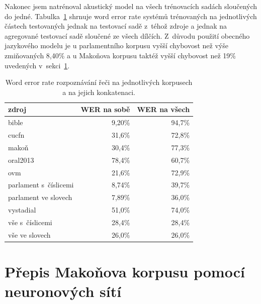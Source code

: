 Nakonec jsem natrénoval akustický model na všech trénovacích
sadách sloučených do jedné.
Tabulka~\ref{tab:csasr:results} shrnuje word error rate systémů trénovaných na
jednotlivých částech testovaných jednak na testovací sadě z~téhož zdroje a
jednak na agregované testovací sadě sloučené ze všech dílčích.
Z~důvodu použití obecného jazykového modelu je u parlamentního korpusu vyšší chybovost než
výše zmiňovaných 8,40\% a u Makoňova korpusu taktéž vyšší chybovost než 19\%
uvedených v~sekci~\ref{sec:deepspeech}.

\begin{table}[htpb]
\begin{center}
\begin{tabular}{|l||r|r|}
\hline
zdroj     & WER na sobě & WER na všech \\
\hline
bible     & 9,20\%  & 94,7\% \\
cucfn     & 31,6\%  & 72,8\% \\
makoň     & 30,4\%  & 77,3\% \\
oral2013  & 78,4\%  & 60,7\% \\
ovm       & 21,6\%  & 72,9\% \\
parlament s~číslicemi & 8,74\%  & 39,7\% \\
parlament ve slovech  & 7,89\%  & 36,0\% \\
vystadial & 51,0\%  & 74,0\% \\
\hline
vše s~číslicemi   & 28,4\%  & 28,4\% \\
vše ve slovech    & 26,0\%  & 26,0\% \\
\hline
\end{tabular}
\caption{Word error rate rozpoznávání řeči na jednotlivých korpusech a na jejich
konkatenaci.}\label{tab:csasr:results}
\end{center}
\end{table}

%

\section{Přepis Makoňova korpusu pomocí neuronových sítí}
\label{sec:deepspeech}

